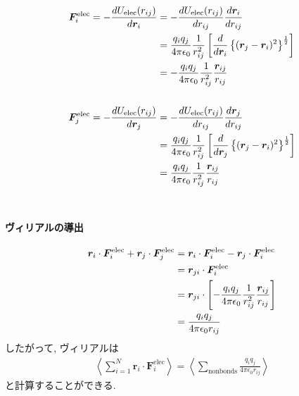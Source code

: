 \begin{align}
   \bm{F}_{i}^{\mathrm{elec}}
 =
   -\frac{d U_{\mathrm{elec}} (r_{ij})}{d \bm{r}_{i}}
&=
   -\frac{d U_{\mathrm{elec}} (r_{ij})}{d r_{ij}}
    \frac{d \bm{r}_{i}}{d r_{ij}}
 \notag
 \\
&=
    \frac{q_{i}q_{j}}{4 \pi \epsilon_{0}}
    \frac{1}{r_{ij}^{2}}
    \left[
           \frac{d}{d \bm{r}_{i}}
           \left\{
                  (\bm{r}_{j} - \bm{r}_{i})^{2}
           \right\}^{\frac{1}{2}}
    \right]
 \notag
 \\
&=
   -\frac{q_{i}q_{j}}{4 \pi \epsilon_{0}}
    \frac{1}{r_{ij}^{2}}
    \frac{\bm{r}_{ij}}{r_{ij}}
 \notag
 \\
 \notag
 \\
   \bm{F}_{j}^{\mathrm{elec}}
 =
   -\frac{d U_{\mathrm{elec}} (r_{ij})}{d \bm{r}_{j}}
 &=
   -\frac{d U_{\mathrm{elec}} (r_{ij})}{d r_{ij}}
    \frac{d \bm{r}_{j}}{d r_{ij}}
 \\
 &=
    \frac{q_{i}q_{j}}{4 \pi \epsilon_{0}}
    \frac{1}{r_{ij}^{2}}
    \left[
           \frac{d}{d \bm{r}_{j}}
           \left\{
                  (\bm{r}_{j} - \bm{r}_{i})^{2}
           \right\}^{\frac{1}{2}}
    \right]
 \\
 &=
    \frac{q_{i}q_{j}}{4 \pi \epsilon_{0}}
    \frac{1}{r_{ij}^{2}}
    \frac{\bm{r}_{ij}}{r_{ij}}
 \notag
\end{align}
\\

\paragraph{ヴィリアルの導出}

\begin{align}
    \bm{r}_{i} \cdot \bm{F}_{i}^{\mathrm{elec}}
   +\bm{r}_{j} \cdot \bm{F}_{j}^{\mathrm{elec}}
 &=
    \bm{r}_{i} \cdot \bm{F}_{i}^{\mathrm{elec}}
   -\bm{r}_{j} \cdot \bm{F}_{i}^{\mathrm{elec}}
 \notag
 \\
 &=
    \bm{r}_{ji} \cdot \bm{F}_{i}^{\mathrm{elec}}
 \notag
 \\
 &=
    \bm{r}_{ji} \cdot
    \left[
          -\frac{q_{i}q_{j}}{4 \pi \epsilon_{0}}
           \frac{1}{r_{ij}^{2}}
           \frac{\bm{r}_{ij}}{r_{ij}}
    \right]
 \notag
 \\
 &=
   \frac{q_{i}q_{j}}{4 \pi \epsilon_{0} r_{ij}}
 \notag
\end{align}
したがって, ヴィリアルは
\begin{align}
   \left\langle
        \sum_{i=1}^{N} \bm{r}_{i} \cdot \bm{F}_{i}^{\mathrm{elec}}
   \right\rangle
 =
   \left\langle
        \sum_{\mathrm{nonbonds}}
        \frac{q_{i}q_{j}}{4 \pi \epsilon_{0} r_{ij}}
   \right\rangle
\end{align}
と計算することができる. 
\clearpage




